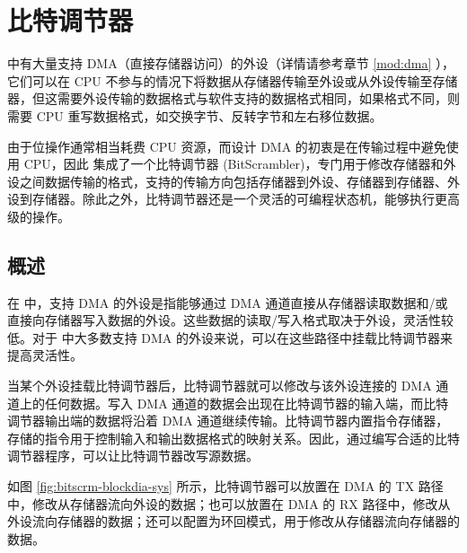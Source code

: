 \documentclass[main\_\_CN.tex]{subfiles}
\begin{document}

\ifglobal
\else
    \listoftodos
    {\let\clearpage\relax \listofdonetodos}
    \tableofcontents
\fi



\hypertarget{bitscrm}{}
\chapter{比特调节器}
\label{mod:bitscrm}

\chipname{} 中有大量支持 DMA（直接存储器访问）的外设（详情请参考章节 \ref{mod:dma} \textit{}），它们可以在 CPU 不参与的情况下将数据从存储器传输至外设或从外设传输至存储器，但这需要外设传输的数据格式与软件支持的数据格式相同，如果格式不同，则需要 CPU 重写数据格式，如交换字节、反转字节和左右移位数据。

由于位操作通常相当耗费 CPU 资源，而设计 DMA 的初衷是在传输过程中避免使用 CPU，因此 \chipname{} 集成了一个比特调节器 (BitScrambler)，专门用于修改存储器和外设之间数据传输的格式，支持的传输方向包括存储器到外设、存储器到存储器、外设到存储器。除此之外，比特调节器还是一个灵活的可编程状态机，能够执行更高级的操作。

\section{概述}

在 \chipname{} 中，支持 DMA 的外设是指能够通过 DMA 通道直接从存储器读取数据和/或直接向存储器写入数据的外设。这些数据的读取/写入格式取决于外设，灵活性较低。对于 \chipname{} 中大多数支持 DMA 的外设来说，可以在这些路径中挂载比特调节器来提高灵活性。

当某个外设挂载比特调节器后，比特调节器就可以修改与该外设连接的 DMA 通道上的任何数据。写入 DMA 通道的数据会出现在比特调节器的输入端，而比特调节器输出端的数据将沿着 DMA 通道继续传输。比特调节器内置指令存储器，存储的指令用于控制输入和输出数据格式的映射关系。因此，通过编写合适的比特调节器程序，可以让比特调节器改写源数据。

如图 \ref{fig:bitscrm-blockdia-sys} 所示，比特调节器可以放置在 DMA 的 TX 路径中，修改从存储器流向外设的数据；也可以放置在 DMA 的 RX 路径中，修改从外设流向存储器的数据；还可以配置为环回模式，用于修改从存储器流向存储器的数据。
\end{document}
